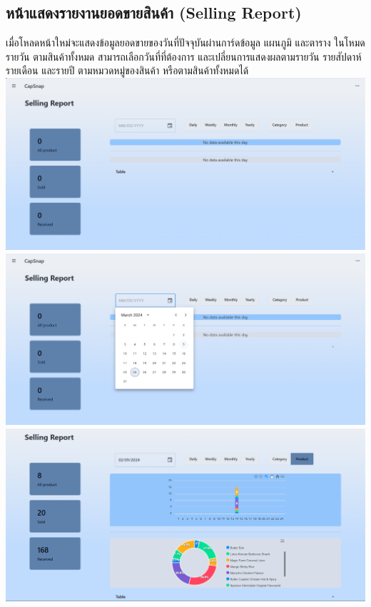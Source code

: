\subsection{หน้าแสดงรายงานยอดขายสินค้า (Selling Report)}
เมื่อโหลดหน้าใหม่จะแสดงข้อมูลยอดขายของวันที่ปัจจุบันผ่านการ์ดข้อมูล แผนภูมิ และตาราง ในโหมดรายวัน ตามสินค้าทั้งหมด สามารถเลือกวันที่ที่ต้องการ และเปลี่ยนการแสดงผลตามรายวัน รายสัปดาห์ รายเดือน และรายปี ตามหมวดหมู่ของสินค้า หรือตามสินค้าทั้งหมดได้\\
{
\includegraphics[scale=0.35]{pic/ui/w15.png}
}\\
{
\includegraphics[scale=0.35]{pic/ui/w16.png}
}\\
{
\includegraphics[scale=0.35]{pic/ui/w17.png}
}\\

